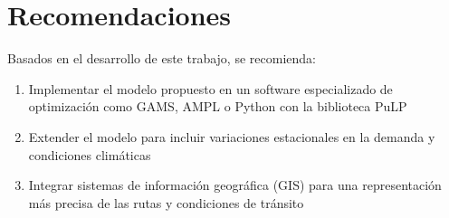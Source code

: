 \documentclass[11pt, a4paper]{article}
\begin{document}
\section{Recomendaciones}
Basados en el desarrollo de este trabajo, se recomienda:

\begin{enumerate}[label=\arabic*., leftmargin=*]
    \item Implementar el modelo propuesto en un software especializado de optimización como GAMS, AMPL o Python con la biblioteca PuLP
    \item Extender el modelo para incluir variaciones estacionales en la demanda y condiciones climáticas
    \item Integrar sistemas de información geográfica (GIS) para una representación más precisa de las rutas y condiciones de tránsito
\end{enumerate}



\end{document}
